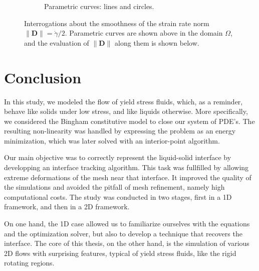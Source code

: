 \documentclass[11 pt]{report}
\begin{document}
\begin{figure}
\begin{subfigure}[t]{0.495\textwidth}
        \caption{Parametric curves: lines and circles.}
    \end{subfigure}
    \begin{subfigure}[t]{\textwidth}
        
    \end{subfigure}
    \begin{subfigure}[t]{\textwidth}
        
    \end{subfigure}
    \caption{Interrogations about the smoothness of the strain rate norm $\|\mathbf{D}\|=\dot \gamma/2$. Parametric curves are shown above in the domain $\Omega$, and the evaluation of $\|\mathbf{D}\|$ along them is shown below.}
    \label{fig:failureRoot}
\end{figure}

\FloatBarrier
{}
\chapter*{Conclusion}

In this study, we modeled the flow of yield stress fluids, which, as a reminder, behave like solids under low stress, and like liquids otherwise. More specifically, we considered the Bingham constitutive model to close our system of PDE's. The resulting non-linearity was handled by expressing the problem as an energy minimization, which was later solved with an interior-point algorithm.

Our main objective was to correctly represent the liquid-solid interface by developping an interface tracking algorithm. This task was fullfilled by allowing extreme deformations of the mesh near that interface. It improved the quality of the simulations and avoided the pitfall of mesh refinement, namely high computational costs. The study was conducted in two stages, first in a 1D framework, and then in a 2D framework.

On one hand, the 1D case allowed us to familiarize ourselves with the equations and the optimization solver, but also to develop a technique that recovers the interface. The core of this thesis, on the other hand, is the simulation of various 2D flows with surprising features, typical of yield stress fluids, like the rigid rotating regions. %
\end{document}
